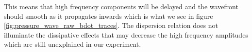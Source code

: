 This means that high frequency components will be delayed and the wavefront should smooth as it propagates inwards which is what we see in figure \ref{fig:pressure_wave_raw_bdot_traces}. The dispersion relation does not illuminate the dissipative effects that may decrease the high frequency amplitudes which are still unexplained in our experiment.










